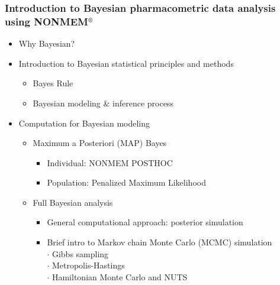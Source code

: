 \documentclass[handout]{beamer}
\begin{document}

\begin{frame}
  \frametitle{Introduction to Bayesian pharmacometric data analysis
    using NONMEM$^\text{\textregistered}$}
  
  \begin{itemize}
\item Why Bayesian?
  \item Introduction to Bayesian statistical principles and methods
    \begin{itemize}
    \item Bayes Rule
    \item Bayesian modeling \& inference process
    \end{itemize}
  \item Computation for Bayesian modeling
    \begin{itemize}
    \item Maximum a Posteriori (MAP) Bayes
      \begin{itemize}
      \item Individual: NONMEM POSTHOC
      \item Population: Penalized Maximum Likelihood
      \end{itemize}
    \item Full Bayesian analysis
      \begin{itemize}
      \item General computational approach: posterior simulation
      \item Brief intro to Markov chain Monte Carlo (MCMC) simulation \\
        \hspace{1em} $\cdot$ Gibbs sampling \\
        \hspace{1em} $\cdot$ Metropolis-Hastings \\
        \hspace{1em} $\cdot$ Hamiltonian Monte Carlo and NUTS
      \end{itemize}
    \end{itemize}
  \end{itemize}

\end{frame}
\end{document}
